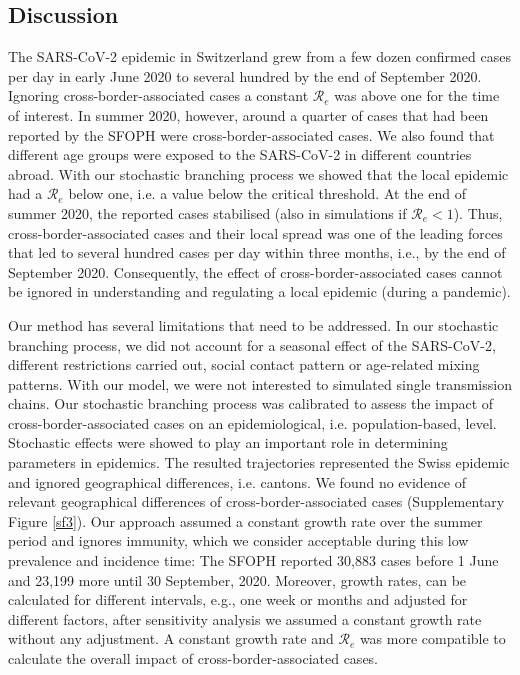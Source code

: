 \documentclass[10pt, a4paper, twoside]{article}
\begin{document}
\begin{multicols}{2}
\section{Discussion}
The SARS-CoV-2 epidemic in Switzerland grew from a few dozen confirmed cases per day in early June 2020 to several hundred by the end of September 2020.
Ignoring cross-border-associated cases a constant $\mathcal{R}_e$ was above one for the time of interest.
In summer 2020, however, around a quarter of cases that had been reported by the SFOPH were cross-border-associated cases.
We also found that different age groups were exposed to the SARS-CoV-2 in different countries abroad.
With our stochastic branching process we showed that the local epidemic had a $\mathcal{R}_e$ below one, i.e. a value below the critical threshold.
At the end of summer 2020, the reported cases stabilised (also in simulations if $\mathcal{R}_e <1$).
Thus, cross-border-associated cases and their local spread was one of the leading forces that led to several hundred cases per day within three months, i.e., by the end of September 2020.
Consequently, the effect of cross-border-associated cases cannot be ignored in understanding and regulating a local epidemic (during a pandemic).

Our method has several limitations that need to be addressed.
In our stochastic branching process, we did not account for a seasonal effect of the SARS-CoV-2, different restrictions carried out, social contact pattern or age-related mixing patterns.
With our model, we were not interested to simulated single transmission chains.
Our stochastic branching process was calibrated to assess the impact of cross-border-associated cases on an epidemiological, i.e. population-based, level.
Stochastic effects were showed to play an important role in determining parameters in epidemics.\cite{althaus_ebola_2015,riou_pattern_2020}
The resulted trajectories represented the Swiss epidemic and ignored geographical differences, i.e. cantons.
We found no evidence of relevant geographical differences of cross-border-associated cases (Supplementary Figure \ref{sf3}).
Our approach assumed a constant growth rate over the summer period and ignores immunity, which we consider acceptable during this low prevalence and incidence time:
The SFOPH reported 30,883 cases before 1 June and 23,199 more until 30 September, 2020.
Moreover, growth rates, can be calculated for different intervals, e.g., one week or months and adjusted for different factors, after sensitivity analysis we assumed a constant growth rate without any adjustment.
A constant growth rate and $\mathcal{R}_e$ was more compatible to calculate the overall impact of cross-border-associated cases.


\end{multicols}
\end{document}
